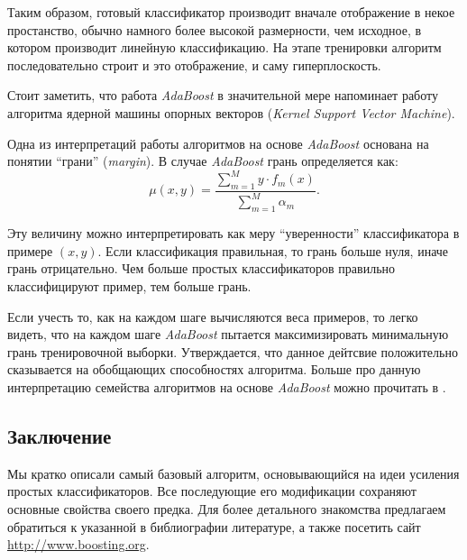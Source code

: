 Таким образом, готовый классификатор производит вначале отображение в некое простанство, обычно намного более высокой размерности, чем исходное, в котором производит линейную классификацию. На этапе тренировки алгоритм последовательно строит и это отображение, и саму гиперплоскость.

Стоит заметить, что работа \emph{AdaBoost} в значительной мере напоминает работу алгоритма ядерной машины опорных векторов (\emph{Kernel Support Vector Machine}).

Одна из интерпретаций работы алгоритмов на основе \emph{AdaBoost} основана на понятии ``грани'' (\emph{margin}). В случае \emph{AdaBoost} грань определяется как:
\begin{displaymath}
  \mu(x, y) = \frac{\sum_{m = 1}^M{y \cdot f_m(x)}}{\sum_{m = 1}^M{\alpha_m}}.
\end{displaymath}

Эту величину можно интерпретировать как меру ``уверенности'' классификатора в примере $(x, y)$. Если классификация правильная, то грань больше нуля, иначе грань отрицательно. Чем больше простых классификаторов правильно классифицируют пример, тем больше грань.

Если учесть то, как на каждом шаге вычисляются веса примеров, то легко видеть, что на каждом шаге \emph{AdaBoost} пытается максимизировать минимальную грань тренировочной выборки. Утверждается, что данное дейтсвие положительно сказывается на обобщающих способностях алгоритма. Больше про данную интерпретацию семейства алгоритмов на основе \emph{AdaBoost} можно прочитать в \cite{rosset04}.

\subsection{Заключение}
Мы кратко описали самый базовый алгоритм, основывающийся на идеи усиления простых классификаторов. Все последующие его модификации сохраняют основные свойства своего предка. Для более детального знакомства предлагаем обратиться к указанной в библиографии литературе, а также посетить сайт \href{http://www.boosting.org}{http://www.boosting.org}.

\newpage
